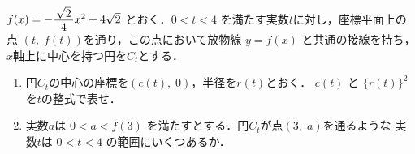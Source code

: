 ﻿\documentclass[../../../uem_tok_q.tex]{subfiles}
\begin{document}
    $f(x)=-\myfraca{\sqrt{2}}{4}x^2+4\sqrt{2}$ とおく．$0<t<4$ を満たす実数$t$に対し，座標平面上の点%
    $(t,\;f(t))$を通り，この点において放物線 $y=f(x)$ と共通の接線を持ち，%
    $x$軸上に中心を持つ円を$C_t$とする．

    \begin{enumerate}
        \item 円$C_t$の中心の座標を$(c(t),\;0)$，半径を$r(t)$とおく．%
            $c(t)$ と $\{r(t)\}^2$ を$t$の整式で表せ．
        \item 実数$a$は $0<a<f(3)$ を満たすとする．円$C_t$が点$(3,\;a)$を通るような%
            実数$t$は $0<t<4$ の範囲にいくつあるか．
    \end{enumerate}
\end{document}
